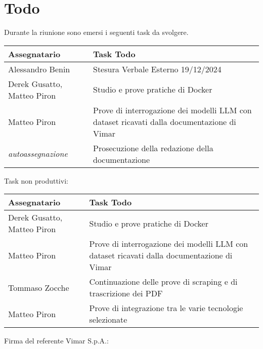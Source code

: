 \section{Todo}
Durante la riunione sono emersi i seguenti task da svolgere.

\begin{center}
  \begin{tabular}{|L{5cm}|L{8cm}|}
    \hline
    \textbf{Assegnatario} & \textbf{Task Todo} \\ \hline
    Alessandro Benin   &  Stesura Verbale Esterno 19/12/2024\\ \hline
     Derek Gusatto, Matteo Piron & Studio e prove pratiche di Docker\\ \hline
    Matteo Piron & Prove di interrogazione dei modelli LLM con dataset ricavati dalla documentazione di Vimar\\ \hline
    \textit{autoassegnazione} & Prosecuzione della redazione della documentazione\\ \hline
  \end{tabular}
\end{center}

Task non produttivi:

\begin{center}
  \begin{tabular}{|L{5cm}|L{8cm}|}
    \hline
    \textbf{Assegnatario} & \textbf{Task Todo} \\ \hline
    Derek Gusatto, Matteo Piron & Studio e prove pratiche di Docker\\ \hline
    Matteo Piron & Prove di interrogazione dei modelli LLM con dataset ricavati dalla documentazione di Vimar\\ \hline
    Tommaso Zocche & Continuazione delle prove di scraping e di trascrizione dei PDF\\ \hline
    Matteo Piron & Prove di integrazione tra le varie tecnologie selezionate\\ \hline
  \end{tabular}
\end{center}
\vspace{4cm}
\noindent Firma del referente Vimar S.p.A.: \underline{\hspace{5cm}}